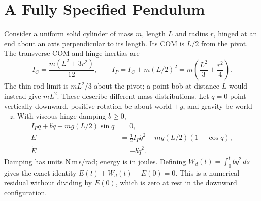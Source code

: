 \section{A Fully Specified Pendulum}

Consider a uniform solid cylinder of mass $m$, length $L$ and radius $r$, hinged
at an end about an axis perpendicular to its length. Its COM is $L/2$ from the
pivot. The transverse COM and hinge inertias are
\begin{equation}
 I_C=\frac{m(L^2+3r^2)}{12},\qquad
 I_P=I_C+m(L/2)^2=m\left(\frac{L^2}{3}+\frac{r^2}{4}\right).
\end{equation}
The thin-rod limit is $mL^2/3$ about the pivot; a point bob at distance $L$
would instead give $mL^2$. These describe different mass distributions.
Let $q=0$ point vertically downward, positive rotation be about world $+y$,
and gravity be world $-z$. With viscous hinge damping $b\geq0$,
\begin{align}
 I_P\ddot q+b\dot q+mg(L/2)\sin q&=0,\\
 E&=\tfrac12 I_P\dot q^2+mg(L/2)(1-\cos q),\\
 \dot E&=-b\dot q^2.
\end{align}
Damping has units N\,m\,s/rad; energy is in joules. Defining
$W_d(t)=\int_0^t b\dot q^2\,ds$ gives the exact identity
$E(t)+W_d(t)-E(0)=0$. This is a numerical residual without dividing by $E(0)$,
which is zero at rest in the downward configuration.

